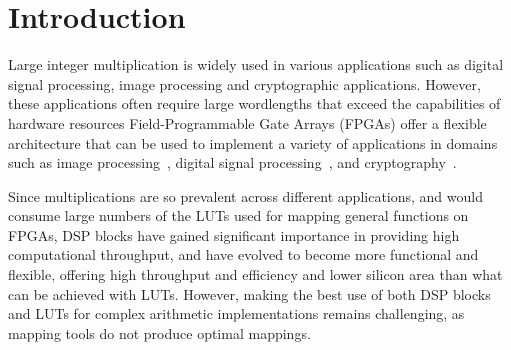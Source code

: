 \documentclass[conference]{IEEEtran}
\begin{document}

\section{Introduction}
Large integer multiplication is widely used in various applications such as digital signal processing, image processing and cryptographic applications. 
However, these applications often require large wordlengths that exceed the capabilities of hardware resources
Field-Programmable Gate Arrays (FPGAs) offer a flexible architecture that can be used to implement a variety of applications in domains such as image processing~\cite{sarrafzadehImageRestorationFPGA2003,zemcikHardwareAccelerationGraphics2002,lewisProceduralTextureMapping1999}, digital signal processing~\cite{tenhunenDSPSystemIntegration1993,baileyImplementingSignalProcessing2002,burlesonDSPReconfigurableComputingDigital2001}, and cryptography~\cite{leongKaratsubaBasedMontgomeryMultiplier2010,kocMontgomeryParameterSpaceArchitecture2016,jangECCAreaTimeEfficientHardware2020,jolfaeiECCHardware2020,prasannaFHEPerformanceModelingFPGA2021,savasFHEDesignImplementationEncryption2020a}. 

Since multiplications are so prevalent across different applications, and would consume large numbers of the LUTs used for mapping general functions on FPGAs, DSP blocks have gained significant importance in providing high computational throughput, and have evolved to become more functional and flexible, offering high throughput and efficiency and lower silicon area than what can be achieved with LUTs.
However, making the best use of both DSP blocks and LUTs for complex arithmetic implementations remains challenging, as mapping tools do not produce optimal mappings.

\end{document}
